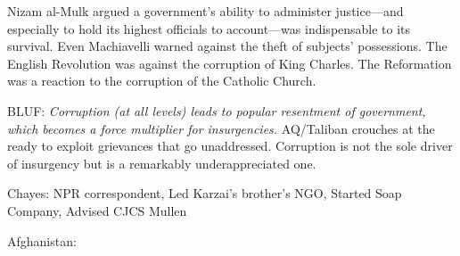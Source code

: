 \documentclass[
]{article}
\begin{document}
Nizam al-Mulk argued a government's ability to administer justice---and
especially to hold its highest officials to account---was indispensable
to its survival. Even Machiavelli warned against the theft of subjects'
possessions. The English Revolution was against the corruption of King
Charles. The Reformation was a reaction to the corruption of the
Catholic Church.

BLUF: \emph{Corruption (at all levels) leads to popular resentment of
government, which becomes a force multiplier for insurgencies.}
AQ/Taliban crouches at the ready to exploit grievances that go
unaddressed. Corruption is not the sole driver of insurgency but is a
remarkably underappreciated one.

Chayes: NPR correspondent, Led Karzai's brother's NGO, Started Soap
Company, Advised CJCS Mullen

Afghanistan:
\end{document}
